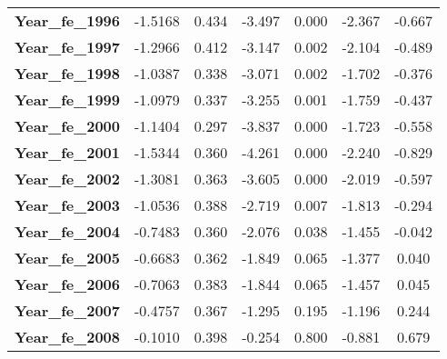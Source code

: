 \begin{center}
\begin{tabular}{lcccccc}
\textbf{Year\_fe\_1996}                              &      -1.5168  &        0.434     &    -3.497  &         0.000        &       -2.367    &       -0.667     \\
\textbf{Year\_fe\_1997}                              &      -1.2966  &        0.412     &    -3.147  &         0.002        &       -2.104    &       -0.489     \\
\textbf{Year\_fe\_1998}                              &      -1.0387  &        0.338     &    -3.071  &         0.002        &       -1.702    &       -0.376     \\
\textbf{Year\_fe\_1999}                              &      -1.0979  &        0.337     &    -3.255  &         0.001        &       -1.759    &       -0.437     \\
\textbf{Year\_fe\_2000}                              &      -1.1404  &        0.297     &    -3.837  &         0.000        &       -1.723    &       -0.558     \\
\textbf{Year\_fe\_2001}                              &      -1.5344  &        0.360     &    -4.261  &         0.000        &       -2.240    &       -0.829     \\
\textbf{Year\_fe\_2002}                              &      -1.3081  &        0.363     &    -3.605  &         0.000        &       -2.019    &       -0.597     \\
\textbf{Year\_fe\_2003}                              &      -1.0536  &        0.388     &    -2.719  &         0.007        &       -1.813    &       -0.294     \\
\textbf{Year\_fe\_2004}                              &      -0.7483  &        0.360     &    -2.076  &         0.038        &       -1.455    &       -0.042     \\
\textbf{Year\_fe\_2005}                              &      -0.6683  &        0.362     &    -1.849  &         0.065        &       -1.377    &        0.040     \\
\textbf{Year\_fe\_2006}                              &      -0.7063  &        0.383     &    -1.844  &         0.065        &       -1.457    &        0.045     \\
\textbf{Year\_fe\_2007}                              &      -0.4757  &        0.367     &    -1.295  &         0.195        &       -1.196    &        0.244     \\
\textbf{Year\_fe\_2008}                              &      -0.1010  &        0.398     &    -0.254  &         0.800        &       -0.881    &        0.679     \\

\end{tabular}
\end{center}

